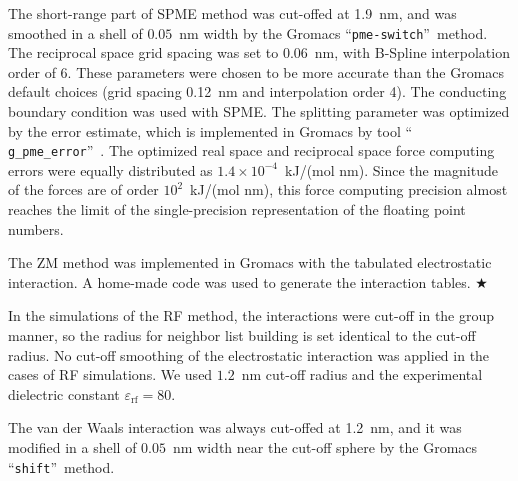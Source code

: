 \documentclass[a4paper,preprint,unsortedaddress,onecolumn,fleqn]{revtex4}
\newcommand{\recheck}[1]{{\color{red} #1}}
\begin{document}
The short-range part of SPME method was cut-offed at 1.9~nm,
and was smoothed in a shell of $0.05$~nm width by the
Gromacs \textquotedblleft \texttt{pme-switch}\textquotedblright\ method. The
reciprocal space grid spacing was set to 0.06~nm, with B-Spline
interpolation order of 6. These parameters were chosen to be more accurate
than the Gromacs default choices (grid spacing 0.12~nm and interpolation
order 4).
\recheck{The conducting boundary condition was used with SPME.}
The splitting parameter was optimized by the error estimate, which is implemented in Gromacs by tool \textquotedblleft 
\texttt{g\_pme\_error}\textquotedblright ~\cite{wang2010optimizing}. The
optimized real space and reciprocal space force computing errors were
equally distributed as $1.4\times 10^{-4}$~kJ/(mol nm). Since the magnitude
of the forces are of order $10^{2}$~kJ/(mol nm), this force computing
precision almost reaches the limit of the single-precision representation of
the floating point numbers.

The ZM method was implemented in Gromacs with the tabulated electrostatic
interaction. A home-made code was used to generate the interaction tables. {%
\color{blue} }$\bigstar $

In the simulations of the RF method, the interactions were cut-off in the
group manner, so the radius for neighbor list building is set identical to
the cut-off radius. No cut-off smoothing of the electrostatic interaction
was applied in the cases of RF simulations. We used $1.2$~nm cut-off radius and the
experimental dielectric constant $\varepsilon _{\text{rf}}=80$.

The van der Waals interaction was always cut-offed at 1.2~nm, and it was
modified in a shell of $0.05$~nm width near the cut-off sphere by the
Gromacs \textquotedblleft \texttt{shift}\textquotedblright\ method.
\end{document}
